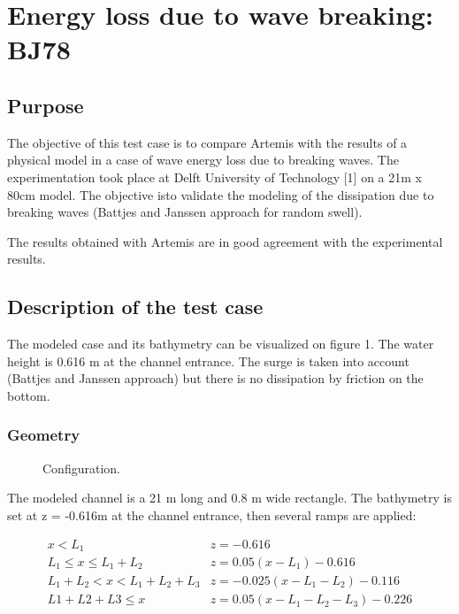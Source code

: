 \chapter{Energy loss due to wave breaking: BJ78}

\section{Purpose}
The objective of this test case is to compare Artemis with the results of a
physical model in a case of wave energy loss due to  breaking waves. The
experimentation took place at Delft University of Technology [1] on a
21m x 80cm model. The objective isto validate the modeling of the dissipation
due to breaking waves (Battjes and Janssen approach for random swell).

The results obtained with Artemis are in good agreement with the experimental
results.

\section{Description of the test case}

The modeled case and its bathymetry can be visualized on figure 1.
The water height is 0.616 m at the channel entrance. The surge is taken into
account
(Battjes and Janssen approach) but there is no dissipation by friction on the
bottom.

\subsection{Geometry}

\begin{figure}[h]
\begin{center}
\end{center}
\caption{Configuration.}
\label{fig:bj78_bathy}
\end{figure}
The modeled channel is a 21 m long and 0.8 m wide rectangle.
The bathymetry is set at z = -0.616m at the channel entrance, then several
ramps are applied:

$$
\begin{array}{ll}
  x < L_1 & z = - 0 . 616 \\
  L_1 \le x \le L_1 + L_2 &  z = 0.05( x - L_1 ) - 0.616\\
  L_1 + L_2 < x < L_1 + L_2 + L_3 & z = - 0.025( x-L_1 -L_2 ) - 0.116 \\
L 1 + L 2 + L 3 \le x & z = 0.05 (x-L_1-L_2-L_3) - 0.226 \\
\end{array}
$$




